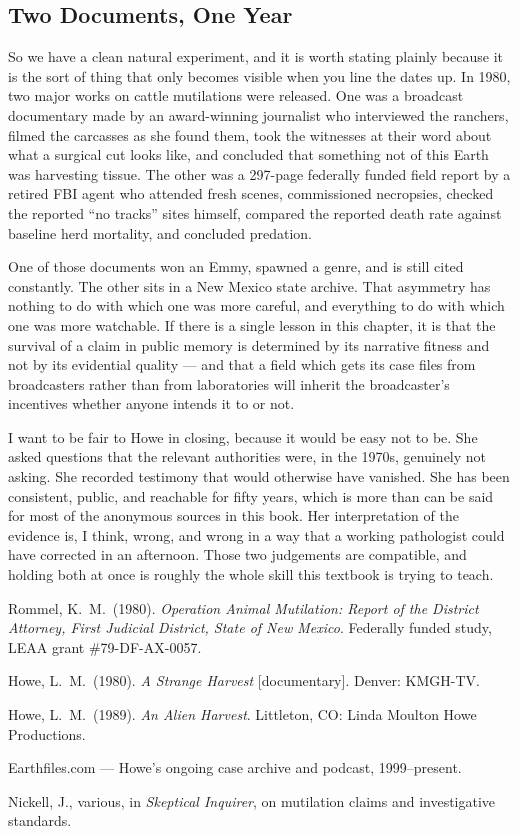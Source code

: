 \subsection{Two Documents, One Year}

So we have a clean natural experiment, and it is worth stating plainly because it is the sort of
thing that only becomes visible when you line the dates up. In 1980, two major works on cattle
mutilations were released. One was a broadcast documentary made by an award-winning journalist who
interviewed the ranchers, filmed the carcasses as she found them, took the witnesses at their word
about what a surgical cut looks like, and concluded that something not of this Earth was
harvesting tissue. The other was a 297-page federally funded field report by a retired FBI agent
who attended fresh scenes, commissioned necropsies, checked the reported ``no tracks'' sites
himself, compared the reported death rate against baseline herd mortality, and concluded
predation.

One of those documents won an Emmy, spawned a genre, and is still cited constantly. The other sits
in a New Mexico state archive. That asymmetry has nothing to do with which one was more careful,
and everything to do with which one was more watchable. If there is a single lesson in this
chapter, it is that the survival of a claim in public memory is determined by its narrative fitness
and not by its evidential quality --- and that a field which gets its case files from broadcasters
rather than from laboratories will inherit the broadcaster's incentives whether anyone intends it
to or not.

I want to be fair to Howe in closing, because it would be easy not to be. She asked questions that
the relevant authorities were, in the 1970s, genuinely not asking. She recorded testimony that
would otherwise have vanished. She has been consistent, public, and reachable for fifty years,
which is more than can be said for most of the anonymous sources in this book. Her interpretation
of the evidence is, I think, wrong, and wrong in a way that a working pathologist could have
corrected in an afternoon. Those two judgements are compatible, and holding both at once is
roughly the whole skill this textbook is trying to teach.

\begin{srcnotes}
\item Rommel, K.\ M.\ (1980). \emph{Operation Animal Mutilation: Report of the District
Attorney, First Judicial District, State of New Mexico}. Federally funded study, LEAA grant
\#79-DF-AX-0057.
\item Howe, L.\ M.\ (1980). \emph{A Strange Harvest} [documentary]. Denver: KMGH-TV.
\item Howe, L.\ M.\ (1989). \emph{An Alien Harvest}. Littleton, CO: Linda Moulton Howe
Productions.
\item Earthfiles.com --- Howe's ongoing case archive and podcast, 1999--present.
\item Nickell, J., various, in \emph{Skeptical Inquirer}, on mutilation claims and investigative
standards.
\end{srcnotes}

